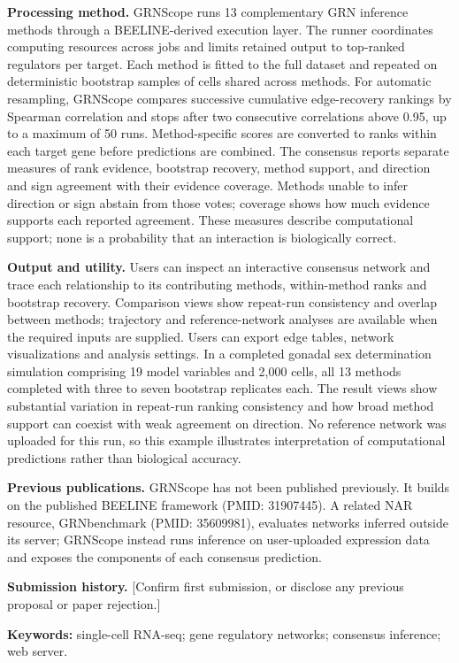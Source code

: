 \documentclass[11pt]{article}
\begin{document}
\textbf{Processing method.} GRNScope runs 13 complementary GRN inference methods through a BEELINE-derived execution layer. The runner coordinates computing resources across jobs and limits retained output to top-ranked regulators per target. Each method is fitted to the full dataset and repeated on deterministic bootstrap samples of cells shared across methods. For automatic resampling, GRNScope compares successive cumulative edge-recovery rankings by Spearman correlation and stops after two consecutive correlations above 0.95, up to a maximum of 50 runs. Method-specific scores are converted to ranks within each target gene before predictions are combined. The consensus reports separate measures of rank evidence, bootstrap recovery, method support, and direction and sign agreement with their evidence coverage. Methods unable to infer direction or sign abstain from those votes; coverage shows how much evidence supports each reported agreement. These measures describe computational support; none is a probability that an interaction is biologically correct.

\textbf{Output and utility.} Users can inspect an interactive consensus network and trace each relationship to its contributing methods, within-method ranks and bootstrap recovery. Comparison views show repeat-run consistency and overlap between methods; trajectory and reference-network analyses are available when the required inputs are supplied. Users can export edge tables, network visualizations and analysis settings. In a completed gonadal sex determination simulation comprising 19 model variables and 2,000 cells, all 13 methods completed with three to seven bootstrap replicates each. The result views show substantial variation in repeat-run ranking consistency and how broad method support can coexist with weak agreement on direction. No reference network was uploaded for this run, so this example illustrates interpretation of computational predictions rather than biological accuracy.

\textbf{Previous publications.} GRNScope has not been published previously. It builds on the published BEELINE framework (PMID: 31907445). A related NAR resource, GRNbenchmark (PMID: 35609981), evaluates networks inferred outside its server; GRNScope instead runs inference on user-uploaded expression data and exposes the components of each consensus prediction.

\textbf{Submission history.} [Confirm first submission, or disclose any previous proposal or paper rejection.]

\textbf{Keywords:} single-cell RNA-seq; gene regulatory networks; consensus inference; web server.
\end{document}
